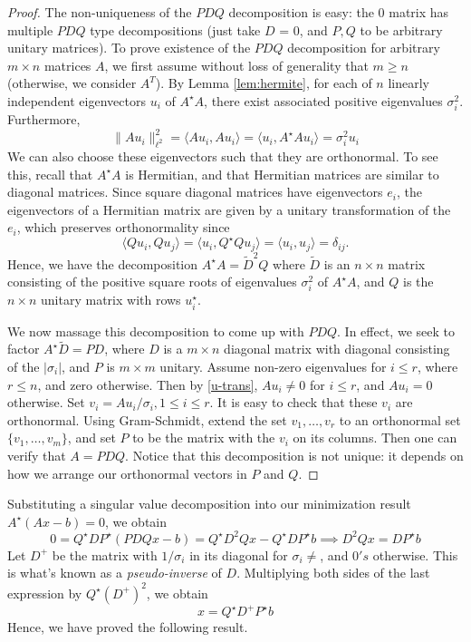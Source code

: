\documentclass[12pt,reqno]{amsart}
\numberwithin{equation}{section}  %
\begin{document}
\begin{proof}
The non-uniqueness of the $PDQ$ decomposition is easy: the $0$ matrix has multiple $PDQ$ type decompositions (just take $D$ = 0, and $P, Q$ to be
arbitrary unitary matrices).
To prove existence of the $PDQ$ decomposition for arbitrary $m \times n$ matrices $A$, we
first assume without loss of generality that $m \ge n$ (otherwise, we consider $A^T$).
By Lemma \ref{lem:hermite}, for each of $n$ linearly independent eigenvectors
$u_i$ of $A^{\star}A$, there exist associated positive eigenvalues $\sigma_i^2$.
Furthermore,
\begin{equation}
\label{u-trans}
\| A u_i \|_{\ell^2}^2 = \langle Au_i, Au_i \rangle  = \langle u_i, A^{\star}A
u_i \rangle = \sigma_i^{2} u_i
\end{equation}
We can also choose these eigenvectors such that they are orthonormal. To see
this, recall that $A^{\star}A$ is Hermitian, and that Hermitian matrices are
similar to diagonal matrices. Since square diagonal matrices have eigenvectors
$e_i$, the eigenvectors of a Hermitian matrix are given by a unitary transformation
of the $e_i$, which preserves orthonormality since 
\begin{equation*}
\langle Q u_i, Qu_j \rangle  = \langle u_i, Q^{\star}Q u_j \rangle  = \langle
u_i, u_j \rangle  = \delta_{ij}.
\end{equation*}
Hence, we have the decomposition $A^{\star}A = \tilde{D}^{2}Q$ where $\tilde{D}$ is an $n \times n$
matrix consisting of the positive square roots of eigenvalues $\sigma_i^2$ of
$A^{\star}A$, and $Q$ is the $n \times n$ unitary matrix with rows
$u_i^{\star}$. 
 
We now massage this decomposition to come up with $PDQ$. In effect, we seek to
factor $A^{\star}\tilde{D} = PD$, where $D$ is a $m \times n$ diagonal matrix
with diagonal consisting of the $ |\sigma_i|$, and $P$ is $m \times m$ unitary. 
Assume non-zero eigenvalues for $i \le r$, where $r \le n$, and zero otherwise.
Then by \eqref{u-trans}, $A u_i \neq 0$ for $i \le r$, and $A u_i = 0$ otherwise.
Set $v_i = Au_i/\sigma_i, 1 \le i \le r$. It is easy to check that these $v_i$ are orthonormal.
Using Gram-Schmidt, extend the set ${v_1, \ldots, v_r}$ to an orthonormal set
$\{v_1, \ldots, v_m \}$, and set $P$ to be the matrix with the $v_i$ on its columns.
Then one can verify that $A = PDQ$. Notice that this decomposition is not unique: it depends on how we
arrange our orthonormal vectors in $P$ and $Q$. 
\end{proof}
Substituting a singular value decomposition into our minimization result $A^{\star}(Ax - b) = 0$, 
we obtain
\begin{equation*}
 0 = Q^{\star} D P^{\star}(PDQx - b) = Q^{\star} D^{2} Qx - Q^{\star}D P^{\star}b \implies D^{2}Qx = DP^{\star}b
\end{equation*}
Let $D^{+}$ be the matrix with $1/\sigma_i$ in its diagonal
for $\sigma_i \neq$, and $0's$ otherwise. This is what's known as a \emph{pseudo-inverse} of $D$. 
Multiplying both sides of the last expression by $Q^{\star}(D^{+})^{2}$, we obtain
\begin{equation*}
x =Q^{\star} D^{+} P^{\star} b  
\end{equation*}
Hence, we have proved the following result. 
\end{document}
